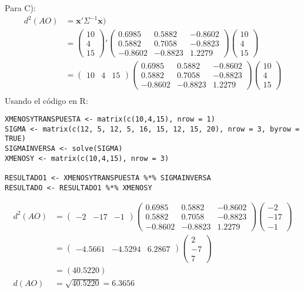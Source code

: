 \begin{sol}
Para C):
\begin{align*}
d^2(AO) &= \mathbf{x}' \Sigma^{-1} \mathbf{x})\\
&= 
\begin{pmatrix}
10 \\ 4 \\ 15
\end{pmatrix}'
\begin{pmatrix}
0.6985 &  0.5882 & -0.8602 \\
0.5882 & 0.7058 & -0.8823  \\
-0.8602 & -0.8823 & 1.2279
\end{pmatrix}
\begin{pmatrix}
10 \\ 4 \\ 15
\end{pmatrix}\\
&= 
\begin{pmatrix}
10&4&15
\end{pmatrix}
\begin{pmatrix}
0.6985 &  0.5882 & -0.8602 \\
0.5882 & 0.7058 & -0.8823  \\
-0.8602 & -0.8823 & 1.2279
\end{pmatrix}
\begin{pmatrix}
10\\4\\15
\end{pmatrix}\\
\end{align*}
Usando el código en R:
\begin{verbatim}
XMENOSYTRANSPUESTA <- matrix(c(10,4,15), nrow = 1)  
SIGMA <- matrix(c(12, 5, 12, 5, 16, 15, 12, 15, 20), nrow = 3, byrow = TRUE)
SIGMAINVERSA <- solve(SIGMA)
XMENOSY <- matrix(c(10,4,15), nrow = 3)

RESULTADO1 <- XMENOSYTRANSPUESTA %*% SIGMAINVERSA
RESULTADO <- RESULTADO1 %*% XMENOSY
\end{verbatim}
\begin{align*}d^2(AO) &=
\begin{pmatrix}
-2&-17&-1
\end{pmatrix}
\begin{pmatrix}
0.6985 &  0.5882 & -0.8602 \\
0.5882 & 0.7058 & -0.8823  \\
-0.8602 & -0.8823 & 1.2279
\end{pmatrix}
\begin{pmatrix}
-2\\-17\\-1
\end{pmatrix}\\
&= \begin{pmatrix}
-4.5661 & -4.5294 & 6.2867
\end{pmatrix}\begin{pmatrix}
2\\-7\\7
\end{pmatrix}\\
&= (40.5220)\\
d(AO) &= \sqrt{40.5220}=6.3656
\end{align*}
\end{sol}
